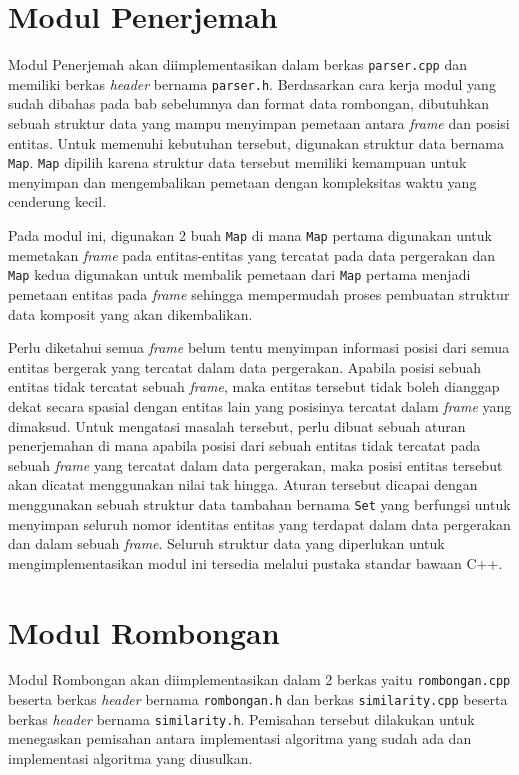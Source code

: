 \section{Modul Penerjemah}
\label{sec:impl-parser}

Modul Penerjemah akan diimplementasikan dalam berkas \texttt{parser.cpp} dan memiliki berkas \textit{header} bernama \texttt{parser.h}. Berdasarkan cara kerja modul yang sudah dibahas pada bab sebelumnya dan format data rombongan, dibutuhkan sebuah struktur data yang mampu menyimpan pemetaan antara \textit{frame} dan posisi entitas. Untuk memenuhi kebutuhan tersebut, digunakan struktur data bernama \texttt{Map}. \texttt{Map} dipilih karena struktur data tersebut memiliki kemampuan untuk menyimpan dan mengembalikan pemetaan dengan kompleksitas waktu yang cenderung kecil.

Pada modul ini, digunakan 2 buah \texttt{Map} di mana \texttt{Map} pertama digunakan untuk memetakan \textit{frame} pada entitas-entitas yang tercatat pada data pergerakan dan \texttt{Map} kedua digunakan untuk membalik pemetaan dari \texttt{Map} pertama menjadi pemetaan entitas pada \textit{frame} sehingga mempermudah proses pembuatan struktur data komposit yang akan dikembalikan.

Perlu diketahui semua \textit{frame} belum tentu menyimpan informasi posisi dari semua entitas bergerak yang tercatat dalam data pergerakan. Apabila posisi sebuah entitas tidak tercatat sebuah \textit{frame}, maka entitas tersebut tidak boleh dianggap dekat secara spasial dengan entitas lain yang posisinya tercatat dalam \textit{frame} yang dimaksud. Untuk mengatasi masalah tersebut, perlu dibuat sebuah aturan penerjemahan di mana apabila posisi dari sebuah entitas tidak tercatat pada sebuah \textit{frame} yang tercatat dalam data pergerakan, maka posisi entitas tersebut akan dicatat menggunakan nilai tak hingga. Aturan tersebut dicapai dengan menggunakan sebuah struktur data tambahan bernama \texttt{Set} yang berfungsi untuk menyimpan seluruh nomor identitas entitas yang terdapat dalam data pergerakan dan dalam sebuah \textit{frame}. Seluruh struktur data yang diperlukan untuk mengimplementasikan modul ini tersedia melalui pustaka standar bawaan C++.

\section{Modul Rombongan}
\label{sec:impl-rombongan}

Modul Rombongan akan diimplementasikan dalam 2 berkas yaitu \texttt{rombongan.cpp} beserta berkas \textit{header} bernama \texttt{rombongan.h} dan berkas \texttt{similarity.cpp} beserta berkas \textit{header} bernama \texttt{similarity.h}. Pemisahan tersebut dilakukan untuk menegaskan pemisahan antara implementasi algoritma yang sudah ada dan implementasi algoritma yang diusulkan.


